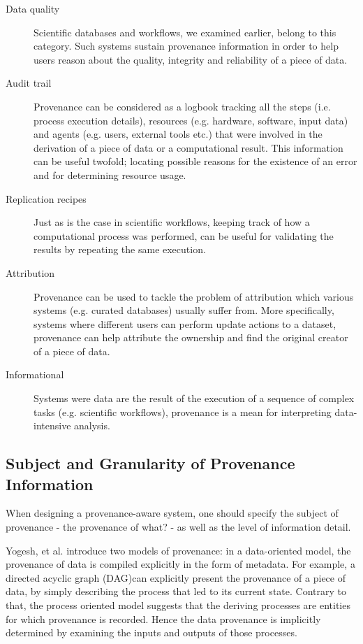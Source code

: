 \begin{description}
  \item[Data quality]
        Scientific databases and workflows, we examined earlier, belong to this category. Such systems sustain provenance information in order to help users reason about the quality, integrity and reliability of a piece of data.
  \item[Audit trail]
        Provenance can be considered as a logbook tracking all the steps (i.e. process execution details), resources (e.g. hardware, software, input data) and agents (e.g. users, external tools etc.) that were involved in the derivation of a piece of data or a computational result. This information can be useful twofold; locating possible reasons for the existence of an error and for determining resource usage\cite{reference4:8}.
  \item[Replication recipes]
        Just as is the case in scientific workflows, keeping track of how a computational process was performed, can be useful for validating the results by repeating the same execution.
  \item[Attribution]
        Provenance can be used to tackle the problem of attribution which various systems (e.g. curated databases) usually suffer from\cite{reference1:53}. More specifically, systems where different users can perform update actions to a dataset, provenance can help attribute the ownership and find the original creator of a piece of data.
  \item[Informational]
        Systems were data are the result of the execution of a sequence of complex tasks (e.g. scientific workflows), provenance is a mean for interpreting data-intensive analysis\cite{reference6}.
\end{description}

\subsection{Subject and Granularity of Provenance Information}

When designing a provenance-aware system, one should specify the subject of provenance - the provenance of what? -  as well as the level of information detail.

Yogesh, et al.\cite{reference4} introduce two models of provenance: in a data-oriented model, the provenance of data is compiled explicitly in the form of metadata. For example, a directed acyclic graph (DAG)can explicitly present the provenance of a piece of data, by simply describing the process that led to its current state.  Contrary to that, the process oriented model suggests that the deriving processes are entities for which provenance is recorded.  Hence the data provenance is implicitly determined by examining the inputs and outputs of those processes.

